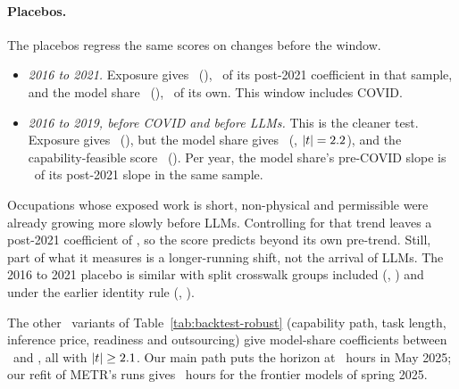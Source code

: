 \paragraph{Placebos.} The placebos regress the same scores on changes before the window.
\begin{itemize}
\item \emph{2016 to 2021.} Exposure gives \btEPlB\ (\btEPlSe), \btEPlRatio\ of its post-2021 coefficient in that sample, and the model share \btMPlB\ (\btMPlSe), \btMPlRatio\ of its own. This window includes COVID.
\item \emph{2016 to 2019, before COVID and before LLMs.} This is the cleaner test. Exposure gives \btEPlPreB\ (\btEPlPreSe), but the model share gives \btMPlPreB\ (\btMPlPreSe, $|t|=2.2$), and the capability-feasible score \btFPlPreB\ (\btFPlPreSe). Per year, the model share's pre-COVID slope is \btMPlPreYearRatio\ of its post-2021 slope in the same sample.
\end{itemize}
Occupations whose exposed work is short, non-physical and permissible were already growing more slowly before LLMs. Controlling for that trend leaves a post-2021 coefficient of \btMSixCtlB, so the score predicts beyond its own pre-trend. Still, part of what it measures is a longer-running shift, not the arrival of LLMs. The 2016 to 2021 placebo is similar with split crosswalk groups included (\btMPlSplitB, \btMPlSplitSe) and under the earlier identity rule (\btMPlIdB, \btMPlIdSe).

The other \btVarN\ variants of Table~\ref{tab:backtest-robust} (capability path, task length, inference price, readiness and outsourcing) give model-share coefficients between \btVarMinB\ and \btVarMaxB, all with $|t|\ge2.1$. Our main path puts the horizon at \btHMay\ hours in May 2025; our refit of METR's runs gives \btHMetr\ hours for the frontier models of spring 2025.



